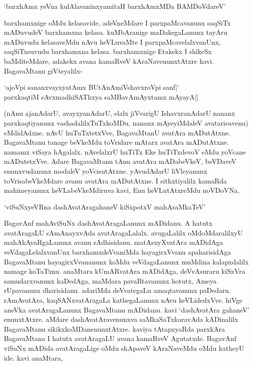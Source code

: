 \begin{shloka}
`barxhAmx yeVna kulAlavaninxyamitaH barxhAmxMDa BAMDoVdareV'
\end{shloka}

barxhamxnige oMdu kelasavide, adeVneMdare I parxpaMcavanunx saqSiTx mADuvudeV barxhamxna kelasa. kuMbAranige maDakegaLanunx tayAru mADuvudu kelasaveMdu nAvu heVLuvaMte I parxpaMcavelalxvanUnx, saqSiTxsuvudu barxhamxna kelasa. barxhamxnige Etakekx I shikeSx baMditeMdare, adakekx avana kamaRveV kAraNavenunxtAtxre kavi. BagavaMtanu giVteyalilx-

\begin{shloka}
`ajoV\s pi sananxvayxyatAmx BUtAnAmiVshavxroV\s pi sanf|'\\
parxkaqtiM sAvxmadhiSAThxya saMBavAmAyxtamx mAyayA||
\end{shloka}

(nAnu ajanAdarU, avayxyanAdarU, elalx jiVvarigU IshavxranAdarU nananx parxkaqtiyanunx vashadalilxTuTxkoMDu, nananx mAyeyiMdaleV avatarisuvenu) eMdidAdxne. nAvU huTuTxtetxVve, BagavaMtanU avatAra mADutAtxne. BagavaMtanu tanage beVkeMdu toVridare mAtarx avatAra mADutAtxne. namamx viSaya hAgalalx. nAvelalxrU huTiTx Eke huTiTxdevoV eMdu yoVcane mADutetxVve. Adare BagavaMtanu tAnu avatAra mADabeVkeV, beVDaveV enunxvudanunx modaleV yoVcisutAtxne. yAvudAdarU liVleyanunx toVrisabeVkeMdare avanu avatAra mADutAtxne. I sithxtiyalilx kamaRda mahimeyanunx heVLabeVkeMdiruva kavi, Enu heVLutAtxreMdu noVDoVNa,

\begin{shloka}
`viSuNxyeVRna dashAvatAragahaneV kiSxpotxV mahAsaMkaTeV'
\end{shloka}

BagavAnf mahAviSuNx dashAvatAragaLanunx mADidanu. A hatutx avatAragaLU sAmAnayxvAda avatAragaLalalx. avugaLalilx oMdoMdaralilxyU mahAkAyaRgaLanunx avanu sAdhisidanu. matAsxyXvatAra mADidAga veVdagaLelalxvanUnx barxhamxdeVvaniMda hayagirxVvanu apaharisidAga BagavaMtanu hayagirxVvananunx koMdu veVdagaLanunx muMdina kalapxdalilx namage koTaTxnu. anaMtara kUmARvatAra mADidAga, deVvAsuraru kiSxVra samudarxvanunx kaDedAga, maMdara pavaRtavanunx hotutx, Ameya rUpavanunx dharisidanu. adariMda deVvategaLu amaqtavanunx paDedaru. rAmAvatAra, kaqSANxvatAragaLa kathegaLanunx nAvu keVLidedxVve. hiVge aneVka avatAragaLanunx BagavaMtanu mADidanu. kavi `dashAvatAra gahaneV' enunxtAtxre. aMdare dashAvatAravenunxva saMkaSaTxkaravAda kADinalilx BagavaMtanu sikikxkoMDanenunxtAtxre. kaviya tAtapxyaRda parxkAra BagavaMtana I hatutx avatAragaLU avana kamaRveV Agutatxde. BagavAnf viSuNx mADida avatAragaLige oMdu shApaveV kAraNaveMdu oMdu katheyU ide. kavi anaMtara,

